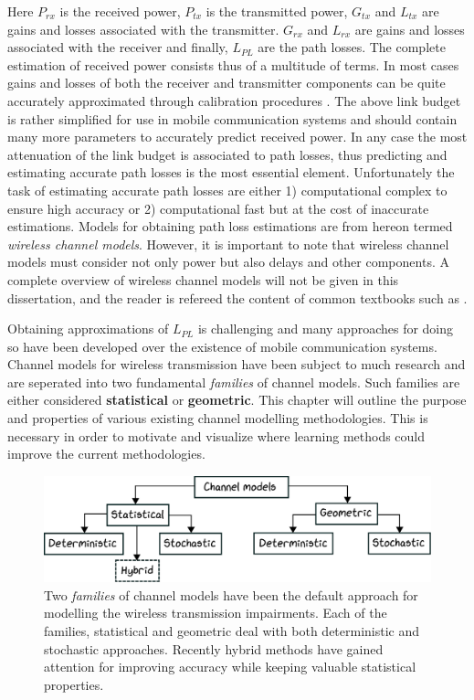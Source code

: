 Here $P_{rx}$ is the received power, $P_{tx}$ is the transmitted power, $G_{tx}$ and $L_{tx}$ are gains and losses associated with the transmitter. $G_{rx}$ and $L_{rx}$ are gains and losses associated with the receiver and finally, $L_{PL}$ are the path losses. The complete estimation of received power consists thus of a multitude of terms. In most cases gains and losses of both the receiver and transmitter components can be quite accurately approximated through calibration procedures  \cite{Molisch2007}. The above link budget is rather simplified for use in mobile communication systems and should contain many more parameters to accurately predict received power. In any case the most attenuation of the link budget is associated to path losses, thus predicting and estimating accurate path losses is the most essential element. Unfortunately the task of estimating accurate path losses are either 1) computational complex to ensure high accuracy or 2) computational fast but at the cost of inaccurate estimations. Models for obtaining path loss estimations are from hereon termed \emph{wireless channel models}. However, it is important to note that wireless channel models must consider not only power but also delays and other components. A complete overview of wireless channel models will not be given in this dissertation, and the reader is refereed the content of common textbooks such as \cite{Tse2005FundamentalsCommunication}.

Obtaining approximations of $L_{PL}$ is challenging and many approaches for doing so have been developed over the existence of mobile communication systems. Channel models for wireless transmission have been subject to much research and are seperated into two fundamental \emph{families} of channel models. Such families are either considered \textbf{statistical} or \textbf{geometric}. This chapter will outline the purpose and properties of various existing channel modelling methodologies. This is necessary in order to motivate and visualize where learning methods could improve the current methodologies.

\begin{figure}[thbp]
    \centering
    \includegraphics[width=\textwidth]{chapters/part_pathloss/figures/channelmodel_tree.eps}
    \caption{Two \emph{families} of channel models have been the default approach for modelling the wireless transmission impairments. Each of the families, statistical and geometric deal with both deterministic and stochastic approaches. Recently hybrid methods have gained attention for improving accuracy while keeping valuable statistical properties.}
    \label{fig:channel_models}
\end{figure}


